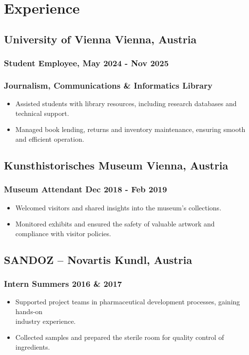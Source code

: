 \documentclass[11pt]{article}
\begin{document}
\section{Experience}
\subsection{University of Vienna \hfill Vienna, Austria}
\subsubsection{Student Employee, \hfill May 2024 - Nov 2025}
\subsubsection{Journalism, Communications \& Informatics Library}
\begin{itemize}
	\item Assisted students with library resources, including research databases and technical support.
	\item Managed book lending, returns and inventory maintenance, ensuring smooth and efficient operation.
\end{itemize}

\subsection{Kunsthistorisches Museum \hfill Vienna, Austria}
\subsubsection{Museum Attendant \hfill Dec 2018 - Feb 2019}
\begin{itemize}
	\item Welcomed visitors and shared insights into the museum's collections.
	\item Monitored exhibits and ensured the safety of valuable artwork and compliance with visitor policies.
\end{itemize}

\subsection{SANDOZ -- Novartis \hfill Kundl, Austria}
\subsubsection{Intern \hfill Summers 2016 \& 2017}
\begin{itemize}
	\item Supported project teams in pharmaceutical development processes, gaining hands-on \\industry experience.
	\item Collected samples and prepared the sterile room for quality control of ingredients.
\end{itemize}
\end{document}
